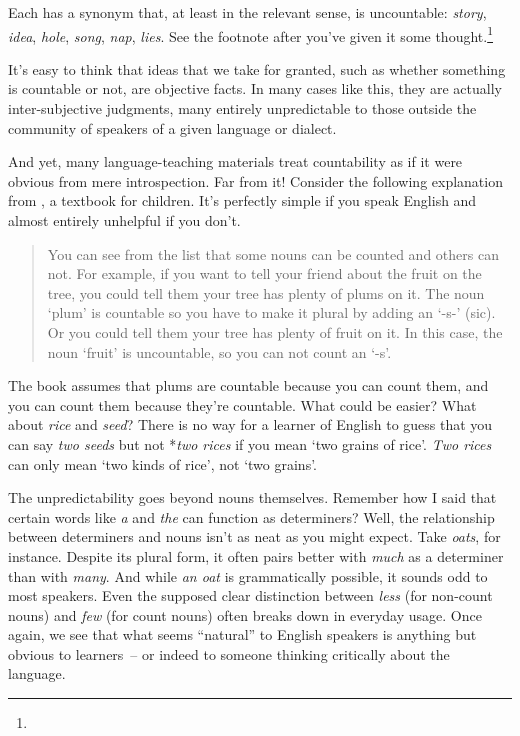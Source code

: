 Each has a synonym that, at least in the relevant sense, is uncountable: \textit{story}, \textit{idea}, \textit{hole}, \textit{song}, \textit{nap}, \textit{lies}. See the footnote after you've given it some thought.\footnote{
} 

It's easy to think that ideas that we take for granted, such as whether something is countable or not, are objective facts. In many cases like this, they are actually inter-subjective judgments, many entirely unpredictable to those outside the community of speakers of a given language or dialect.

And yet, many language-teaching materials treat countability as if it were obvious from mere introspection. Far from it! Consider the following explanation from \citet{allen2008}, a textbook for children. It's perfectly simple if you speak English and almost entirely unhelpful if you don't.

\begin{quote}
    You can see from the list that some nouns can be counted and others can not. For example, if you want to tell your friend about the fruit on the tree, you could tell them your tree has plenty of plums on it. The noun `plum' is countable so you have to make it plural by adding an `-s-' (sic). Or you could tell them your tree has plenty of fruit on it. In this case, the noun `fruit' is uncountable, so you can not count an `-s'. \citet[1]{allen2008}
\end{quote}

The book assumes that plums are countable because you can count them, and you can count them because they're countable. What could be easier? What about \textit{rice} and \textit{seed}? There is no way for a learner of English to guess that you can say \textit{two seeds} but not *\textit{two rices} if you mean `two grains of rice'. \textit{Two rices} can only mean `two kinds of rice', not `two grains'.

The unpredictability goes beyond nouns themselves. Remember how I said that certain words like \textit{a} and \textit{the} can function as determiners? Well, the relationship between determiners and nouns isn't as neat as you might expect. Take \textit{oats}, for instance. Despite its plural form, it often pairs better with \textit{much} as a determiner than with \textit{many}. And while \textit{an oat} is grammatically possible, it sounds odd to most speakers. Even the supposed clear distinction between \textit{less} (for non-count nouns) and \textit{few} (for count nouns) often breaks down in everyday usage. Once again, we see that what seems ``natural'' to English speakers is anything but obvious to learners~-- or indeed to someone thinking critically about the language.

